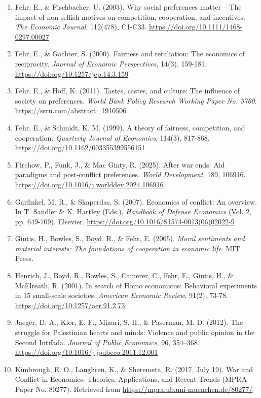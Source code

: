 \documentclass[14pt]{article}
\theoremstyle{remark}
\begin{document}
\begin{enumerate}
    \item Fehr, E., \& Fischbacher, U. (2003). Why social preferences matter -- The impact of non-selfish motives on competition, cooperation, and incentives. \textit{The Economic Journal}, 112(478), C1-C33. \url{https://doi.org/10.1111/1468-0297.00027}
    \item Fehr, E., \& Gächter, S. (2000). Fairness and retaliation: The economics of reciprocity. \textit{Journal of Economic Perspectives}, 14(3), 159-181. \url{https://doi.org/10.1257/jep.14.3.159}
    \item Fehr, E., \& Hoff, K. (2011). Tastes, castes, and culture: The influence of society on preferences. \textit{World Bank Policy Research Working Paper No. 5760}. \url{https://ssrn.com/abstract=1910506}
    \item Fehr, E., \& Schmidt, K. M. (1999). A theory of fairness, competition, and cooperation. \textit{Quarterly Journal of Economics}, 114(3), 817-868. \url{https://doi.org/10.1162/003355399556151}
    \item Firchow, P., Funk, J., \& Mac Ginty, R. (2025). After war ends: Aid paradigms and post‐conflict preferences. \textit{World Development}, 189, 106916. \url{https://doi.org/10.1016/j.worlddev.2024.106916}
    \item Garfinkel, M. R., \& Skaperdas, S. (2007). Economics of conflict: An overview. In T. Sandler \& K. Hartley (Eds.), \textit{Handbook of Defense Economics} (Vol. 2, pp. 649-709). Elsevier. \url{https://doi.org/10.1016/S1574-0013(06)02022-9}
    \item Gintis, H., Bowles, S., Boyd, R., \& Fehr, E. (2005). \textit{Moral sentiments and material interests: The foundations of cooperation in economic life}. MIT Press.
    \item Henrich, J., Boyd, R., Bowles, S., Camerer, C., Fehr, E., Gintis, H., \& McElreath, R. (2001). In search of Homo economicus: Behavioral experiments in 15 small-scale societies. \textit{American Economic Review}, 91(2), 73-78. \url{https://doi.org/10.1257/aer.91.2.73}
    \item Jaeger, D. A., Klor, E. F., Miaari, S. H., \& Paserman, M. D. (2012). The struggle for Palestinian hearts and minds: Violence and public opinion in the Second Intifada. \textit{Journal of Public Economics}, 96, 354--368. \url{https://doi.org/10.1016/j.jpubeco.2011.12.001}
    \item Kimbrough, E. O., Laughren, K., \& Sheremeta, R. (2017, July 19). War and Conflict in Economics: Theories, Applications, and Recent Trends (MPRA Paper No. 80277). Retrieved from \url{https://mpra.ub.uni-muenchen.de/80277/}

\end{enumerate}
\end{document}
